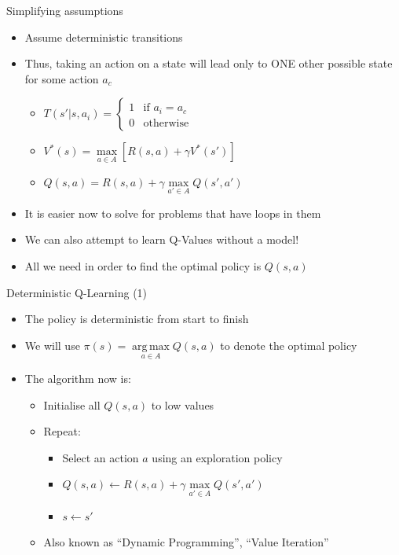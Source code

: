 \documentclass[]{beamer}
\providecommand{\tightlist}{%
  \setlength{\itemsep}{0pt}\setlength{\parskip}{0pt}}
\newcommand{\twopartdefo}[3]
{
  \left\{
    \begin{array}{ll}
      #1 & \mbox{if } #2 \\
      #3 & \mbox{otherwise}
    \end{array}
  \right.
}
\DeclareMathOperator*{\argmax}{arg\,max}
\begin{document}
\begin{frame}{Simplifying assumptions}

\begin{itemize}
\tightlist
\item
  Assume deterministic transitions
\item
  Thus, taking an action on a state will lead only to ONE other possible
  state for some action \(a_c\)

  \begin{itemize}
  \tightlist
  \item
    \(T(s'|s,a_i) = \twopartdefo{ 1 } {a_i = a_c} {0}\)
  \item
    \(V^*(s) = \max\limits_{a \in A} \left[ R(s,a) + \gamma V^*(s') \right]\)
  \item
    \(Q(s,a) = R(s,a) + \gamma \max\limits_{a' \in A} {{Q}(s',a')}\)
  \end{itemize}
\item
  It is easier now to solve for problems that have loops in them
\item
  We can also attempt to learn Q-Values without a model!
\item
  All we need in order to find the optimal policy is \(Q(s,a)\)
\end{itemize}

\end{frame}

\begin{frame}{Deterministic Q-Learning (1)}

\begin{itemize}
\tightlist
\item
  The policy is deterministic from start to finish
\item
  We will use \(\pi(s) = \argmax\limits_{a \in A} Q(s,a)\) to denote the
  optimal policy
\item
  The algorithm now is:

  \begin{itemize}
  \tightlist
  \item
    Initialise all \(Q(s,a)\) to low values
  \item
    Repeat:

    \begin{itemize}
    \tightlist
    \item
      Select an action \(a\) using an exploration policy
    \item
      \(Q(s,a) \gets R(s,a) + \gamma \max\limits_{a' \in A} {{Q}(s',a')}\)
    \item
      \(s \gets s'\)
    \end{itemize}
  \item
    Also known as ``Dynamic Programming'', ``Value Iteration''
  \end{itemize}
\end{itemize}

\end{frame}
\end{document}
